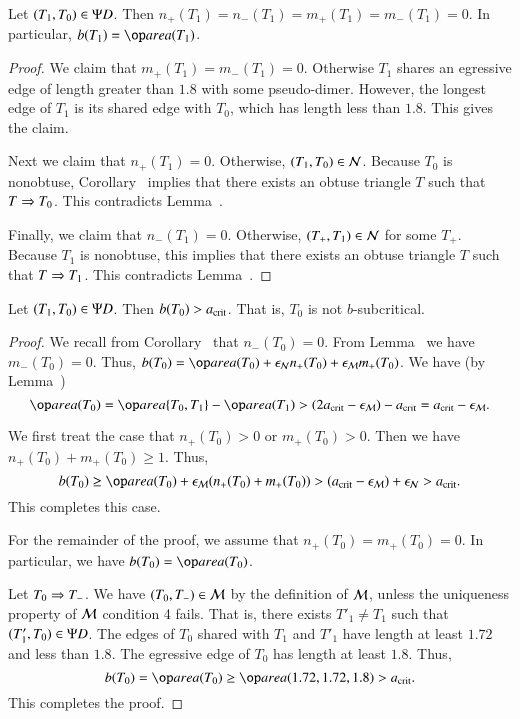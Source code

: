 \begin{lemma} 
  Let $(T_1,T_0)\in\Psi D$.  Then
  $n_+(T_1)=n_-(T_1)=m_+(T_1)=m_-(T_1)=0$.  In particular, $b(T_1) =
  \area(T_1)$.
\end{lemma}

\begin{proof}  
  We claim that $m_+(T_1)=m_-(T_1)=0$.  Otherwise $T_1$ shares an
  egressive edge of length greater than $1.8$ with some pseudo-dimer.
  However, the longest edge of $T_1$ is its shared edge with $T_0$,
  which has length less than $1.8$.  This gives the claim.

  Next we claim that $n_+(T_1)=0$.  Otherwise, $(T_1,T_0)\in \mathcal N$.
  Because $T_0$ is nonobtuse, Corollary~ 
  implies that there exists an obtuse
  triangle $T$ such that $T\Rightarrow T_0$.  This contradicts
  Lemma~.

  Finally, we claim that $n_-(T_1)=0$.  Otherwise, $(T_+,T_1)\in \mathcal N$ for
  some $T_+$.  Because $T_1$ is nonobtuse, this implies that there exists
  an obtuse triangle $T$ such that $T\Rightarrow T_1$.  This contradicts
  Lemma~.
\end{proof}

\begin{lemma}  
  Let $(T_1,T_0)\in\Psi D$.  Then $b(T_0) > a_\text{crit}$.  That is, $T_0$ is
  not $b$-subcritical.
\end{lemma}

\begin{proof}
  We recall from Corollary~ that $n_-(T_0)=0$.  From
  Lemma~ we have $m_-(T_0)=0$.  Thus, $b(T_0) =
  \area(T_0) + \epsN n_+(T_0) + \epsM m_+(T_0)$.  We have
  (by Lemma~)
\[
\area(T_0) = \area\{T_0,T_1\} - \area(T_1) 
> (2\acrit-\epsM) -\acrit = \acrit - \epsM.
\]

We first treat the case that $n_+(T_0)>0$ or $m_+(T_0)>0$.  Then we
have $n_+(T_0)+m_+(T_0)\ge 1$.  Thus,
\[
b(T_0) \ge \area(T_0) + \epsM (n_+(T_0)+m_+(T_0)) > (\acrit - \epsM)
+ \epsN > \acrit.
\]
This completes this case.

For the remainder of the proof, we assume that $n_+(T_0)=m_+(T_0)=0$.  In
particular, we have $b(T_0) = \area(T_0)$.

Let $T_0\Rightarrow T_-$.  We have $(T_0,T_-)\in\mathcal M$ by the definition of $\mathcal M$,
unless the uniqueness property of $\mathcal M$ condition 4 fails.  That is,
there exists $T'_1\ne T_1$ such that $(T'_1,T_0)\in\Psi D$.  The edges of
$T_0$ shared with $T_1$ and $T'_1$ have length at least $1.72$ and
less than $1.8$.  The egressive edge of $T_0$ has length at least
$1.8$.  Thus,
\[
b(T_0) = \area (T_0) \ge \area(1.72,1.72,1.8) > \acrit.
\]
This completes the proof.
\end{proof}



